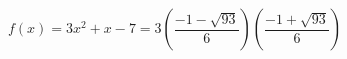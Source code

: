 \documentclass{ximera}
\author{Lee Wayand}
\begin{document}
\begin{exercise}








\begin{question}


\[
f(x) = 3x^2 + x - 7 = 3 \left( \frac{-1 - \sqrt{93}}{6} \right) \left( \frac{-1 + \sqrt{93}}{6} \right)
\]

\end{question}















\end{exercise}
\end{document}
